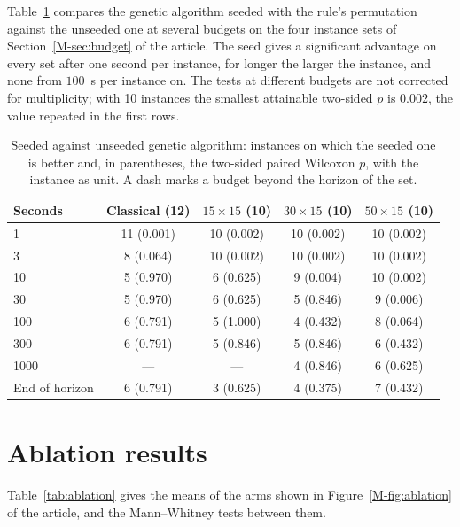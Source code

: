 \documentclass[11pt]{article}
\begin{document}
Table~\ref{tab:semilla} compares the genetic algorithm seeded with the
rule's permutation against the unseeded one at several budgets on the
four instance sets of Section~\ref{M-sec:budget} of the article. The
seed gives a significant advantage on every set after one second per
instance, for longer the larger the instance, and none from $100$~s per
instance on. The tests at different budgets are not corrected for
multiplicity; with 10 instances the smallest attainable two-sided $p$ is
$0.002$, the value repeated in the first rows.

\begin{table}[!htb]
\centering\small
\caption{Seeded against unseeded genetic algorithm: instances on which the
seeded one is better and, in parentheses, the two-sided paired Wilcoxon
$p$, with the instance as unit. A dash marks a budget beyond the horizon
of the set.}
\label{tab:semilla}
\begin{tabular}{lcccc}
\toprule
Seconds & Classical (12) & $15{\times}15$ (10) & $30{\times}15$ (10) & $50{\times}15$ (10) \\
\midrule
1 & 11 (0.001) & 10 (0.002) & 10 (0.002) & 10 (0.002) \\
3 & 8 (0.064) & 10 (0.002) & 10 (0.002) & 10 (0.002) \\
10 & 5 (0.970) & 6 (0.625) & 9 (0.004) & 10 (0.002) \\
30 & 5 (0.970) & 6 (0.625) & 5 (0.846) & 9 (0.006) \\
100 & 6 (0.791) & 5 (1.000) & 4 (0.432) & 8 (0.064) \\
300 & 6 (0.791) & 5 (0.846) & 5 (0.846) & 6 (0.432) \\
1000 & --- & --- & 4 (0.846) & 6 (0.625) \\
End of horizon & 6 (0.791) & 3 (0.625) & 4 (0.375) & 7 (0.432) \\
\bottomrule
\end{tabular}
\end{table}

\section{Ablation results}
\label{sec:ablationtab}

Table~\ref{tab:ablation} gives the means of the arms shown in
Figure~\ref{M-fig:ablation} of the article, and the Mann--Whitney tests
between them.
\end{document}

